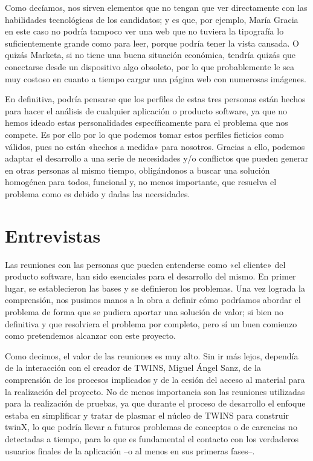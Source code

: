 Como decíamos, nos sirven elementos que no tengan que ver directamente con las habilidades tecnológicas de los candidatos; y es que, por ejemplo, María Gracia en este caso no podría tampoco ver una web que no tuviera la tipografía lo suficientemente grande como para leer, porque podría tener la vista cansada. O quizás Marketa, si no tiene una buena situación económica, tendría quizás que conectarse desde un dispositivo algo obsoleto, por lo que probablemente le sea muy costoso en cuanto a tiempo cargar una página web con numerosas imágenes.

En definitiva, podría pensarse que los perfiles de estas tres personas están hechos para hacer el análisis de cualquier aplicación o producto software, ya que no hemos ideado estas personalidades específicamente para el problema que nos compete. Es por ello por lo que podemos tomar estos perfiles ficticios como válidos, pues no están «hechos a medida» para nosotros. Gracias a ello, podemos adaptar el desarrollo a una serie de necesidades y/o conflictos que pueden generar en otras personas al mismo tiempo, obligándonos a buscar una solución homogénea para todos, funcional y, no menos importante, que resuelva el problema como es debido y dadas las necesidades.

\section{Entrevistas}

Las reuniones con las personas que pueden entenderse como «el cliente» del producto software, han sido esenciales para el desarrollo del mismo. En primer lugar, se establecieron las bases y se definieron los problemas. Una vez lograda la comprensión, nos pusimos manos a la obra a definir cómo podríamos abordar el problema de forma que se pudiera aportar una solución de valor; si bien no definitiva y que resolviera el problema por completo, pero sí un buen comienzo como pretendemos alcanzar con este proyecto.

Como decimos, el valor de las reuniones es muy alto. Sin ir más lejos, dependía de la interacción con el creador de TWINS, Miguel Ángel Sanz, de la comprensión de los procesos implicados y de la cesión del acceso al material para la realización del proyecto. No de menos importancia son las reuniones utilizadas para la realización de pruebas, ya que durante el proceso de desarrollo el enfoque estaba en simplificar y tratar de plasmar el núcleo de TWINS para construir twinX, lo que podría llevar a futuros problemas de conceptos o de carencias no detectadas a tiempo, para lo que es fundamental el contacto con los verdaderos usuarios finales de la aplicación --o al menos en sus primeras fases--.%

